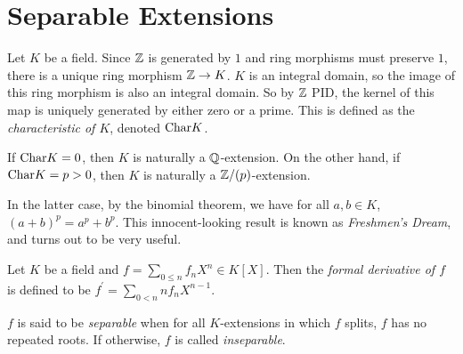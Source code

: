 \documentclass[main.tex]{subfiles}
\begin{document}
\section{Separable Extensions}

\begin{dfn}  
  
  Let $K$ be a field. 
  Since $\mathbb{Z}$ is generated by $1$ and ring morphisms must preserve $1$, 
  there is a unique ring morphism $\mathbb{Z} \to K$.
  $K$ is an integral domain, 
  so the image of this ring morphism is also an integral domain. 
  So by $\mathbb{Z}$ PID, the kernel of this map is 
  uniquely generated by either zero or a prime. 
  This is defined as the \emph{characteristic of $K$},
  denoted $\mathrm{Char}K$.
\end{dfn}

\begin{rmk} 
  If $\mathrm{Char}K = 0$, then $K$ is naturally a $\mathbb{Q}$-extension.
  On the other hand, if $\mathrm{Char}K = p > 0$, 
  then $K$ is naturally a $\mathbb{Z}/(p)$-extension. 

  In the latter case, by the binomial theorem, 
  we have for all $a, b \in K$, $(a + b)^p = a^p + b^p$. 
  This innocent-looking result is known as \emph{Freshmen's Dream},
  and turns out to be very useful. 
\end{rmk}

\begin{dfn} 
  
  Let $K$ be a field and $f = \sum_{0 \leq n} f_n X^n \in K[X]$. 
  Then the \emph{formal derivative of $f$} is defined to be 
  $f^\prime = \sum_{0 < n} n f_n X^{n-1}$. 

  $f$ is said to be \emph{separable} when 
  for all $K$-extensions in which $f$ splits, $f$ has no repeated roots. 
  If otherwise, $f$ is called \emph{inseparable}. 
\end{dfn}

\end{document}

